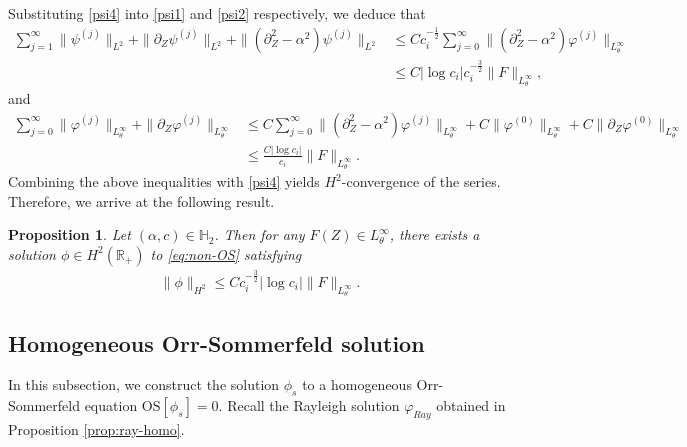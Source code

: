 \documentclass[reqno,11pt]{amsart}
\numberwithin{equation}{section}
\numberwithin{equation}{section}
\theoremstyle{plain}
\newtheorem{proposition}[theorem]{Proposition}
\begin{document}
Substituting \eqref{psi4} into \eqref{psi1} and \eqref{psi2} respectively, we deduce that
$$
\begin{aligned}
	\sum_{j=1}^\infty\|\psi^{(j)}\|_{L^2}+\|\partial_Z\psi^{(j)}\|_{L^2}+\|(\partial_Z^2-\alpha^2)\psi^{(j)}\|_{L^2}&\leq Cc_i^{-\frac12}\sum_{j=0}^\infty\|(\partial_Z^2-\alpha^2)\varphi^{(j)}\|_{L^\infty_{\theta}}\\
	&\leq C|\log c_i| c_i^{-\frac32}\|F\|_{L^\infty_{\theta}},
\end{aligned}
$$
and
$$\begin{aligned}
	\sum_{j=0}^{\infty}	\|\varphi^{(j)}\|_{L^\infty_{\theta}}+\|\partial_Z\varphi^{(j)}\|_{L^\infty_{\theta}}&\leq C\sum_{j=0}^\infty\|(\partial_Z^2-\alpha^2)\varphi^{(j)}\|_{L^\infty_{\theta}}+C\|\varphi^{(0)}\|_{L^\infty_\theta}+C\|\partial_Z\varphi^{(0)}\|_{L^\infty_{\theta}}\nonumber\\
	&\leq \frac{C|\log c_i|}{c_i}\|F\|_{L^\infty_{\theta}}.
\end{aligned}
$$
Combining the above inequalities with \eqref{psi4} yields $H^2$-convergence of the series. Therefore, we arrive at the following result.
\begin{proposition}\label{prop:os-nonhom}
    Let $(\alpha,c)\in\mathbb{H}_2$. Then for any $F(Z)\in L^\infty_{\theta}$, there exists a solution $\phi\in H^2(\mathbb{R}_+)$ to \eqref{eq:non-OS} satisfying 
    \begin{align}
    \|\phi\|_{H^2} \leq Cc_i^{-\frac32}|\log c_i|\|F\|_{L^\infty_{\theta}}.\label{os}
    \end{align}
\end{proposition}

\subsection{Homogeneous Orr-Sommerfeld solution}
In this subsection, we construct the solution $\phi_s$ to 
a homogeneous Orr-Sommerfeld equation $\mathrm{OS}[\phi_s]=0.$ Recall the Rayleigh solution $\varphi_{Ray}$ obtained in Proposition \ref{prop:ray-homo}.
\end{document}
